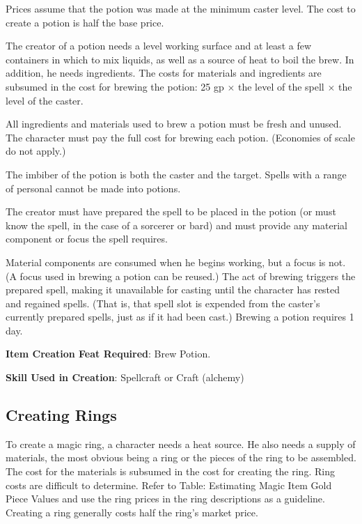 Prices assume that the potion was made at the minimum caster level. The cost to create a potion is half the base price.

				
The creator of a potion needs a level working surface and at least a few containers in which to mix liquids, as well as a source of heat to boil the brew. In addition, he needs ingredients. The costs for materials and ingredients are subsumed in the cost for brewing the potion: 25 gp \mbox{$\times$} the level of the spell \mbox{$\times$} the level of the caster.
				
All ingredients and materials used to brew a potion must be fresh and unused. The character must pay the full cost for brewing each potion. (Economies of scale do not apply.)
				
The imbiber of the potion is both the caster and the target. Spells with a range of personal cannot be made into potions.
				
The creator must have prepared the spell to be placed in the potion (or must know the spell, in the case of a sorcerer or bard) and must provide any material component or focus the spell requires.
				
Material components are consumed when he begins working, but a focus is not. (A focus used in brewing a potion can be reused.) The act of brewing triggers the prepared spell, making it unavailable for casting until the character has rested and regained spells. (That is, that spell slot is expended from the caster's currently prepared spells, just as if it had been cast.) Brewing a potion requires 1 day.
				
\textbf{Item Creation Feat Required}: Brew Potion.
				
\textbf{Skill Used in Creation}: Spellcraft or Craft (alchemy)
				
\subsection{Creating Rings}

				
To create a magic ring, a character needs a heat source. He also needs a supply of materials, the most obvious being a ring or the pieces of the ring to be assembled. The cost for the materials is subsumed in the cost for creating the ring. Ring costs are difficult to determine. Refer to Table: Estimating Magic Item Gold Piece Values and use the ring prices in the ring descriptions as a guideline. Creating a ring generally costs half the ring's market price.
				
